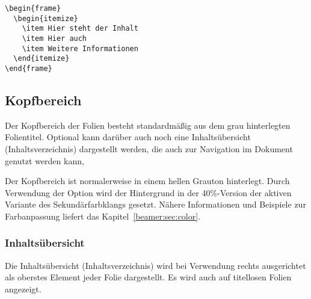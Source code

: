 \begin{minipage}{0.5\textwidth}
\begin{verbatim}
\begin{frame}
  \begin{itemize}
    \item Hier steht der Inhalt
    \item Hier auch
    \item Weitere Informationen
  \end{itemize}
\end{frame}
\end{verbatim}
\end{minipage}
\begin{minipage}{0.5\textwidth}
\end{minipage}

\subsection{Kopfbereich}\label{subsec:head}

Der Kopfbereich der Folien besteht standardmäßig aus dem grau hinterlegten
Folientitel. Optional kann darüber auch noch eine Inhaltsübersicht
(Inhaltsverzeichnis) dargestellt werden,
die auch zur Navigation im Dokument genutzt werden kann,

\begin{Declaration}
\end{Declaration}

Der Kopfbereich ist normalerweise in einem hellen Grauton hinterlegt.
Durch Verwendung der Option  wird der Hintergrund
in der 40\%-Version der aktiven Variante des Sekundärfarbklangs gesetzt.
Nähere Informationen und Beispiele zur Farbanpassung liefert das
Kapitel~\ref{beamer:sec:color}.

\subsubsection{Inhaltsübersicht}

Die Inhaltsübersicht (Inhaltsverzeichnis) wird bei Verwendung rechts
ausgerichtet als oberstes Element jeder Folie dargestellt.
Es wird auch auf titellosen Folien angezeigt.


\begin{Declaration}
  \\
\end{Declaration}

